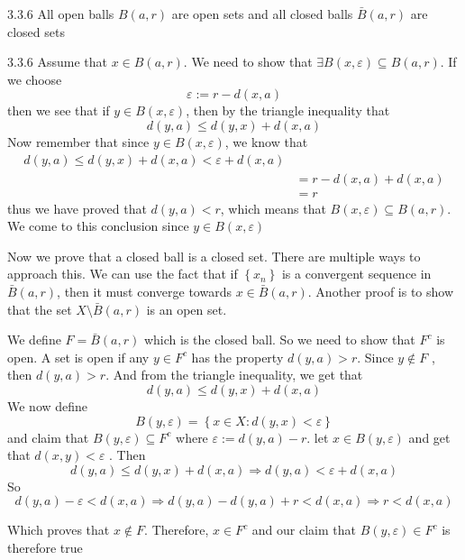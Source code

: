 \documentclass[a4paper,norsk]{article}
\renewcommand{\leq}{\leqslant}
\renewcommand{\epsilon}{\varepsilon}
\begin{document}
\begin{lemmabox}{3.3.6}{}
All open balls $ B \left( a, r \right)  $ are open sets and all closed balls $ \bar{B} \left( a, r \right)  $  are closed sets

\begin{proofbox}{3.3.6}{}
  Assume that $ x \in B \left( a, r \right)  $. We need to show that $ \exists B \left( x, \epsilon  \right) \subseteq B \left( a, r \right)  $. If we choose 
  \[
      \epsilon := r - d \left( x, a \right) 
  \]
  then we see that if $ y \in B \left( x, \epsilon  \right)  $, then by the triangle inequality that
  \[
      d(y, a) \leq d(y, x) + d(x, a)
  \]
  Now remember that since $ y \in B \left( x, \epsilon  \right)  $, we know that 
  \begin{align*}
    d(y, a) \leq d(y, x) + d(x, a) < \epsilon + d(x, a) \\
    &= r - d(x, a) + d(x, a) \\
    &= r
  \end{align*}
  thus we have proved that $ d(y, a) < r $, which means that $ B \left( x, \epsilon  \right) \subseteq B \left( a, r \right)  $. We come to this conclusion since $ y \in B \left( x, \epsilon \right)  $

  \vspace{0.5cm}

  Now we prove that a closed ball is a closed set. There are multiple ways to approach this. We can use the fact that if $ \left\{ x_n \right\}  $ is a convergent sequence in $ \bar{B} \left( a, r \right)  $, then it must converge towards $ x \in \bar{B} \left( a, r \right) $. Another proof is to show that the set $ X \setminus \bar{B} \left( a, r \right)  $ is an open set. 

  \vspace{0.5cm}

  We define $ F = \bar{B} \left( a, r \right)  $ which is the closed ball. So we need to show that  $ F^c $ is open. A set is open if any $ y \in F^c $ has the property $ d(y, a) > r $. Since $ y \notin F $ , then $ d(y,a) > r $. And from the triangle inequality, we get that 
  \[
      d(y, a) \leq d(y,x) + d(x, a)
  \]
  We now define 
  \[
      B \left( y, \epsilon  \right) = \left\{ x \in X : d(y, x) < \epsilon  \right\} 
  \]
  and claim that $ B \left( y, \epsilon  \right) \subseteq F^c  $ where $ \epsilon := d(y, a) - r $. let $ x \in B \left( y, \epsilon  \right) $ and get that $ d(x, y) < \epsilon  $ .  Then
  \[
      d(y, a) \leq d(y, x) + d(x, a) \Rightarrow d(y, a) < \epsilon  + d(x, a)
  \]
  So 
  \[
      d(y, a) - \epsilon  < d(x,a) \Rightarrow d(y, a) - d(y, a) + r < d(x, a) \Rightarrow r < d(x, a)
  \]

  Which proves that $ x \notin F $. Therefore, $ x \in F^c $ and our claim that $ B \left( y, \epsilon  \right) \in F^c $ is therefore true
  
\end{proofbox}
\end{lemmabox}
\end{document}
